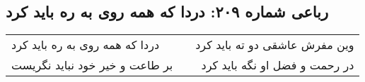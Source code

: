 \begin{center}
\section*{رباعی شماره ۲۰۹: دردا که همه روی به ره باید کرد}
\label{sec:sh209}
\begin{longtable}{l p{0.5cm} r}
دردا که همه روی به ره باید کرد
&&
وین مفرش عاشقی دو ته باید کرد
\\
بر طاعت و خیر خود نباید نگریست
&&
در رحمت و فضل او نگه باید کرد
\\
\end{longtable}
\end{center}
